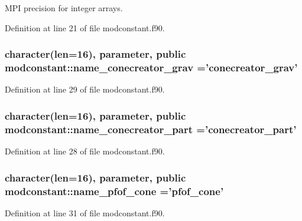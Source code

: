 M\-P\-I precision for integer arrays. 



Definition at line 21 of file modconstant.\-f90.

\hypertarget{classmodconstant_a6b0007da6df5318a91769f3130de6cb4}{
\subsubsection[{name\-\_\-conecreator\-\_\-grav}]{\setlength{\rightskip}{0pt plus 5cm}character(len=16), parameter, public modconstant\-::name\-\_\-conecreator\-\_\-grav ='conecreator\-\_\-grav'}}\label{classmodconstant_a6b0007da6df5318a91769f3130de6cb4}


Definition at line 29 of file modconstant.\-f90.

\hypertarget{classmodconstant_a8cb8268586070d3ab8e654e5d2a434f4}{
\subsubsection[{name\-\_\-conecreator\-\_\-part}]{\setlength{\rightskip}{0pt plus 5cm}character(len=16), parameter, public modconstant\-::name\-\_\-conecreator\-\_\-part ='conecreator\-\_\-part'}}\label{classmodconstant_a8cb8268586070d3ab8e654e5d2a434f4}


Definition at line 28 of file modconstant.\-f90.

\hypertarget{classmodconstant_a79267a90db91d9d4ef5f6179a358a27d}{
\subsubsection[{name\-\_\-pfof\-\_\-cone}]{\setlength{\rightskip}{0pt plus 5cm}character(len=16), parameter, public modconstant\-::name\-\_\-pfof\-\_\-cone ='{\bf pfof\-\_\-cone}'}}\label{classmodconstant_a79267a90db91d9d4ef5f6179a358a27d}


Definition at line 31 of file modconstant.\-f90.

